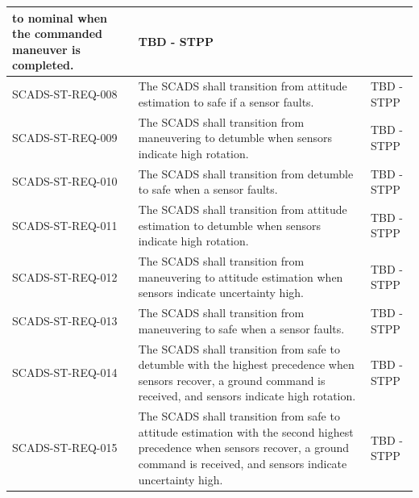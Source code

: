\documentclass{article}
\begin{document}
\begin{longtable}{|l|p{9cm}|p{5cm}|}
                                    to nominal when the commanded maneuver is 
                                    completed. & TBD - STPP \\ \hline
                SCADS-ST-REQ-008 & The SCADS shall transition from attitude 
                                    estimation to safe if a sensor faults. 
                                    & TBD - STPP \\ \hline
                SCADS-ST-REQ-009 & The SCADS shall transition from maneuvering 
                                    to detumble when sensors indicate high rotation. 
                                    & TBD - STPP \\ \hline
                SCADS-ST-REQ-010 & The SCADS shall transition from detumble 
                                    to safe when a sensor faults.
                                    & TBD - STPP \\ \hline
                SCADS-ST-REQ-011 & The SCADS shall transition from attitude 
                                    estimation to detumble when sensors indicate 
                                    high rotation.
                                    & TBD - STPP \\ \hline
                SCADS-ST-REQ-012 & The SCADS shall transition from maneuvering to
                                    attitude estimation when sensors indicate 
                                    uncertainty high.
                                    & TBD - STPP \\ \hline
                SCADS-ST-REQ-013 & The SCADS shall transition from maneuvering to
                                    safe when a sensor faults.
                                    & TBD - STPP \\ \hline
                SCADS-ST-REQ-014 & The SCADS shall transition from safe to
                                    detumble with the highest precedence when 
                                    sensors recover, a ground command is received, 
                                    and sensors indicate high rotation. 
                                    & TBD - STPP \\ \hline
                SCADS-ST-REQ-015 & The SCADS shall transition from safe to
                                    attitude estimation with the second highest 
                                    precedence when sensors recover, a 
                                    ground command is received, and sensors 
                                    indicate uncertainty high. 
                                    & TBD - STPP \\ \hline

\end{longtable}
\end{document}

